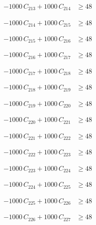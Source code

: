\documentclass[a4paper,11pt]{article}
\begin{document}
\begin{align}
-1000\,C_{213} + 1000\,C_{214} &\geq 48 \nonumber
\end{align}

\begin{align}
-1000\,C_{214} + 1000\,C_{215} &\geq 48 \nonumber
\end{align}

\begin{align}
-1000\,C_{215} + 1000\,C_{216} &\geq 48 \nonumber
\end{align}

\begin{align}
-1000\,C_{216} + 1000\,C_{217} &\geq 48 \nonumber
\end{align}

\begin{align}
-1000\,C_{217} + 1000\,C_{218} &\geq 48 \nonumber
\end{align}

\begin{align}
-1000\,C_{218} + 1000\,C_{219} &\geq 48 \nonumber
\end{align}

\begin{align}
-1000\,C_{219} + 1000\,C_{220} &\geq 48 \nonumber
\end{align}

\begin{align}
-1000\,C_{220} + 1000\,C_{221} &\geq 48 \nonumber
\end{align}

\begin{align}
-1000\,C_{221} + 1000\,C_{222} &\geq 48 \nonumber
\end{align}

\begin{align}
-1000\,C_{222} + 1000\,C_{223} &\geq 48 \nonumber
\end{align}

\begin{align}
-1000\,C_{223} + 1000\,C_{224} &\geq 48 \nonumber
\end{align}

\begin{align}
-1000\,C_{224} + 1000\,C_{225} &\geq 48 \nonumber
\end{align}

\begin{align}
-1000\,C_{225} + 1000\,C_{226} &\geq 48 \nonumber
\end{align}

\begin{align}
-1000\,C_{226} + 1000\,C_{227} &\geq 48 \nonumber
\end{align}
\end{document}
